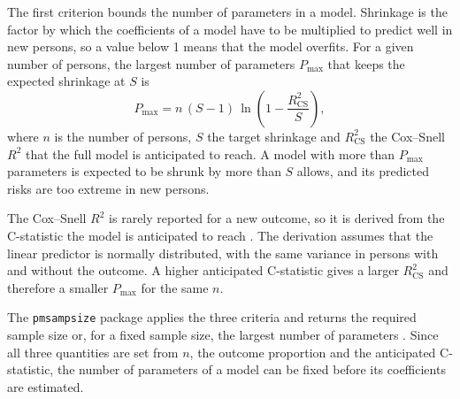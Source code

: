 The first criterion bounds the number of parameters in a model.
Shrinkage is the factor by which the coefficients of a model have to be multiplied to predict well in new persons, so a value below 1 means that the model overfits.
For a given number of persons, the largest number of parameters $P_{\max}$ that keeps the expected shrinkage at $S$ is
\begin{equation}
  P_{\max} = n\,(S-1)\,\ln\!\left(1 - \frac{R^2_{\mathrm{CS}}}{S}\right),
  \label{eq:tech-pmax}
\end{equation}
where $n$ is the number of persons, $S$ the target shrinkage and $R^2_{\mathrm{CS}}$ the Cox--Snell $R^2$ that the full model is anticipated to reach.
A model with more than $P_{\max}$ parameters is expected to be shrunk by more than $S$ allows, and its predicted risks are too extreme in new persons.

The Cox--Snell $R^2$ is rarely reported for a new outcome, so it is derived from the C-statistic the model is anticipated to reach \cite{riley2021cstat}.
The derivation assumes that the linear predictor is normally distributed, with the same variance in persons with and without the outcome.
A higher anticipated C-statistic gives a larger $R^2_{\mathrm{CS}}$ and therefore a smaller $P_{\max}$ for the same $n$.

The \texttt{pmsampsize} package applies the three criteria and returns the required sample size or, for a fixed sample size, the largest number of parameters .
Since all three quantities are set from $n$, the outcome proportion and the anticipated C-statistic, the number of parameters of a model can be fixed before its coefficients are estimated.
